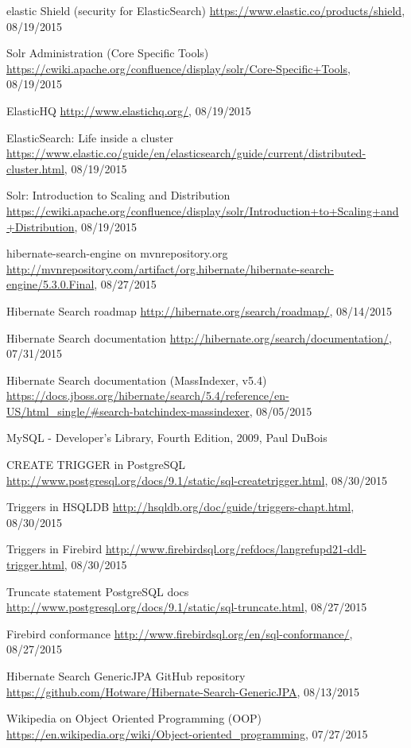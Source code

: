 \begin{thebibliography}{100}
	 elastic Shield (security for ElasticSearch)
	\url{https://www.elastic.co/products/shield}, 08/19/2015

	 Solr Administration (Core Specific Tools)
	\url{https://cwiki.apache.org/confluence/display/solr/Core-Specific+Tools}, 08/19/2015

	 ElasticHQ
	\url{http://www.elastichq.org/}, 08/19/2015

	 ElasticSearch: Life inside a cluster
	\url{https://www.elastic.co/guide/en/elasticsearch/guide/current/distributed-cluster.html}, 08/19/2015

	 Solr: Introduction to Scaling and Distribution
	\url{https://cwiki.apache.org/confluence/display/solr/Introduction+to+Scaling+and+Distribution}, 08/19/2015

	 hibernate-search-engine on mvnrepository.org
	\url{http://mvnrepository.com/artifact/org.hibernate/hibernate-search-engine/5.3.0.Final}, 08/27/2015

	 Hibernate Search roadmap
	\url{http://hibernate.org/search/roadmap/}, 08/14/2015

	 Hibernate Search documentation
	\url{http://hibernate.org/search/documentation/}, 07/31/2015

	 Hibernate Search documentation (MassIndexer, v5.4)
	\url{https://docs.jboss.org/hibernate/search/5.4/reference/en-US/html_single/#search-batchindex-massindexer}, 08/05/2015

	 MySQL - Developer's Library, Fourth Edition, 2009, Paul DuBois

	 CREATE TRIGGER in PostgreSQL
	\url{http://www.postgresql.org/docs/9.1/static/sql-createtrigger.html}, 08/30/2015

	 Triggers in HSQLDB
	\url{http://hsqldb.org/doc/guide/triggers-chapt.html}, 08/30/2015

	 Triggers in Firebird
	\url{http://www.firebirdsql.org/refdocs/langrefupd21-ddl-trigger.html}, 08/30/2015

	 Truncate statement PostgreSQL docs
	\url{http://www.postgresql.org/docs/9.1/static/sql-truncate.html}, 08/27/2015

	 Firebird conformance
	\url{http://www.firebirdsql.org/en/sql-conformance/}, 08/27/2015

	 Hibernate Search GenericJPA GitHub repository
	\url{https://github.com/Hotware/Hibernate-Search-GenericJPA}, 08/13/2015

	 Wikipedia on Object Oriented Programming (OOP)
	\url{https://en.wikipedia.org/wiki/Object-oriented_programming}, 07/27/2015


\end{thebibliography}

\newpage{\pagestyle{empty}\cleardoublepage}